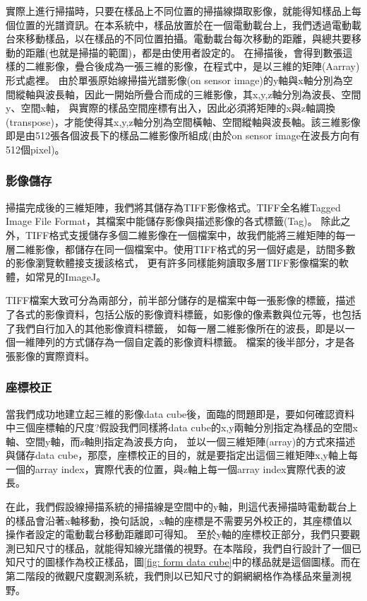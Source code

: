 \documentclass[12pt]{article}
\begin{document}
實際上進行掃描時，只要在樣品上不同位置的掃描線擷取影像，就能得知樣品上每個位置的光譜資訊。在本系統中，樣品放置於在一個電動載台上，我們透過電動載台來移動樣品，以在樣品的不同位置拍攝。電動載台每次移動的距離，與總共要移動的距離(也就是掃描的範圍)，都是由使用者設定的。
在掃描後，會得到數張這樣的二維影像，疊合後成為一張三維的影像，在程式中，是以三維的矩陣(Aarray)形式處裡。
由於單張原始線掃描光譜影像(on sensor image)的y軸與x軸分別為空間縱軸與波長軸，因此一開始所疊合而成的三維影像，其x,y,z軸分別為波長、空間y、空間x軸，
與實際的樣品空間座標有出入，因此必須將矩陣的x與z軸調換(transpose)，才能使得其x,y,z軸分別為空間橫軸、空間縱軸與波長軸。該三維影像即是由512張各個波長下的樣品二維影像所組成(由於on sensor image在波長方向有512個pixel)。

\subsubsection{影像儲存}\label{section: saveTiff}
掃描完成後的三維矩陣，我們將其儲存為TIFF影像格式。TIFF全名維Tagged Image File Format，其檔案中能儲存影像與描述影像的各式標籤(Tag)。
除此之外，TIFF格式支援儲存多個二維影像在一個檔案中，故我們能將三維矩陣的每一層二維影像，都儲存在同一個檔案中。使用TIFF格式的另一個好處是，訪間多數的影像瀏覽軟體接支援該格式，
更有許多同樣能夠讀取多層TIFF影像檔案的軟體，如常見的ImageJ。

TIFF檔案大致可分為兩部分，前半部分儲存的是檔案中每一張影像的標籤，描述了各式的影像資料，包括公版的影像資料標籤，如影像的像素數與位元等，也包括了我們自行加入的其他影像資料標籤，
如每一層二維影像所在的波長，即是以一個一維陣列的方式儲存為一個自定義的影像資料標籤。
檔案的後半部分，才是各張影像的實際資料。

\subsubsection{座標校正}
當我們成功地建立起三維的影像data cube後，面臨的問題即是，要如何確認資料中三個座標軸的尺度?假設我們同樣將data cube的x,y兩軸分別指定為樣品的空間x軸、空間y軸，而z軸則指定為波長方向，
並以一個三維矩陣(array)的方式來描述與儲存data cube，那麼，座標校正的目的，就是要指定出這個三維矩陣x,y軸上每一個的array index，實際代表的位置，與z軸上每一個array index實際代表的波長。

在此，我們假設線掃描系統的掃描線是空間中的y軸，則這代表掃描時電動載台上的樣品會沿著x軸移動，換句話說，x軸的座標是不需要另外校正的，其座標值以操作者設定的電動載台移動距離即可得知。
至於y軸的座標校正部分，我們只要觀測已知尺寸的樣品，就能得知線光譜儀的視野。在本階段，我們自行設計了一個已知尺寸的圖樣作為校正樣品，圖\ref{fig: form data cube}中的樣品就是這個圖樣。而在第二階段的微觀尺度觀測系統，我們則以已知尺寸的銅網網格作為樣品來量測視野。
\end{document}
